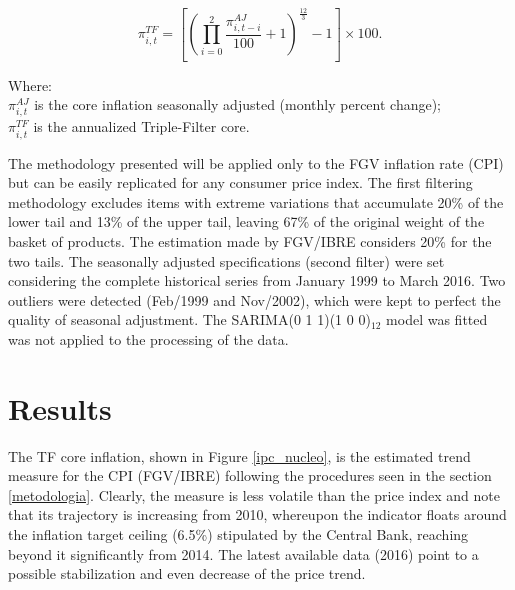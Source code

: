 \documentclass[10pt]{article}
\begin{document}
\begin{equation}\label{equacao_mm3}
\pi_{i,t}^{TF} = \left [\left (\prod_{i=0}^{2} \frac{\pi_{i,t-i}^{AJ}}{100} + 1  \right )^{\frac{12}{3}} -1 \right ] \times 100.
\end{equation}

\noindent
Where:\\
$\pi_{i,t}^{AJ}$ is the core inflation seasonally adjusted (monthly percent change);\\
$\pi_{i,t}^{TF}$ is the annualized Triple-Filter core.\vspace{0.3cm}

The methodology presented will be applied only to the FGV inflation rate (CPI) but can be easily replicated for any consumer price index. The first filtering methodology excludes items with extreme variations that accumulate 20\% of the lower tail and 13\% of the upper tail, leaving 67\% of the original weight of the basket of products. The estimation made by FGV/IBRE considers 20\% for the two tails. The  seasonally adjusted specifications (second filter) were set considering the complete historical series from January 1999 to March 2016. Two outliers were detected (Feb/1999 and Nov/2002), which were kept to perfect the quality of seasonal adjustment. The SARIMA(0 1 1)(1 0 0)$_{12}$ model was fitted was not applied to the processing of the data.


\section{Results}\label{resultados}

The TF core inflation, shown in Figure \ref{ipc_nucleo}, is the estimated trend measure for the CPI (FGV/IBRE) following the procedures seen in the section \ref{metodologia}. Clearly, the measure is less volatile than the price index and note that its trajectory is increasing from 2010, whereupon the indicator floats around the inflation target ceiling (6.5\%) stipulated by the Central Bank, reaching beyond it significantly from 2014. The latest available data (2016) point to a possible stabilization and even decrease of the price trend.
\end{document}
